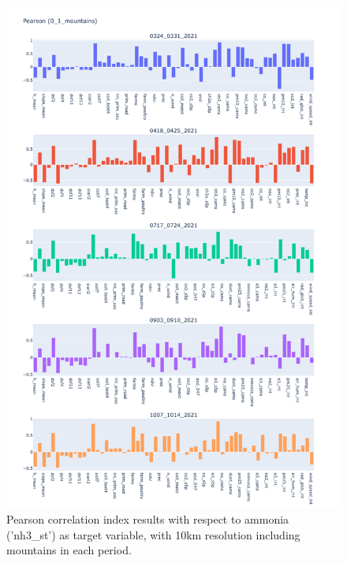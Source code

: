 \begin{figure}[H]
    \centering
    \includegraphics[scale=0.38]{images/tests/0_1_mountainsnh3_st_pearson.png}
    \caption{Pearson correlation index results with respect to ammonia ('nh3\_st') as target variable, with 10km resolution including mountains in each period.}
    
\end{figure}
